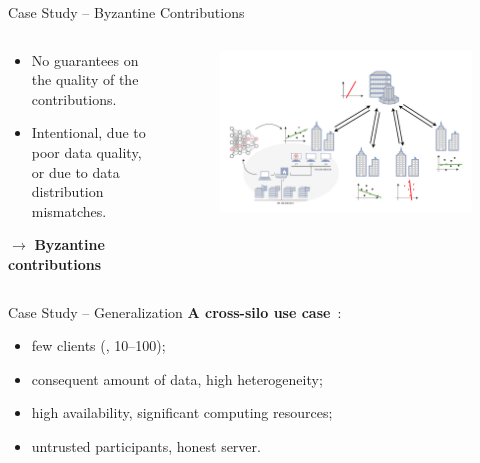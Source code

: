 \begin{frame}{Case Study -- Byzantine Contributions}
\begin{columns}
    \begin{column}{0.4\textwidth}
      \begin{itemize}
        \item No guarantees on the quality of the contributions.
        \item Intentional, due to poor data quality, or due to data distribution mismatches.
      \end{itemize}
      
      $\rightarrow$ \textbf{Byzantine contributions}
    \end{column}
    
    \begin{column}{0.6\textwidth}
      \begin{figure}
        \centering
        \includegraphics[width=1.1\linewidth,right]{figures/intro/poisoning.drawio.pdf}
      \end{figure}
    \end{column}
  \end{columns}
\end{frame}

\begin{frame}{Case Study -- Generalization}
  \textbf{A cross-silo use case}~\cite{kairouz_AdvancesOpenProblems_2021}:
  \begin{itemize}
    \item few clients (\ie, 10--100);
    \item consequent amount of data, high heterogeneity;
    \item high availability, significant computing resources;
    \item untrusted participants, honest server.
  \end{itemize}
\end{frame}

